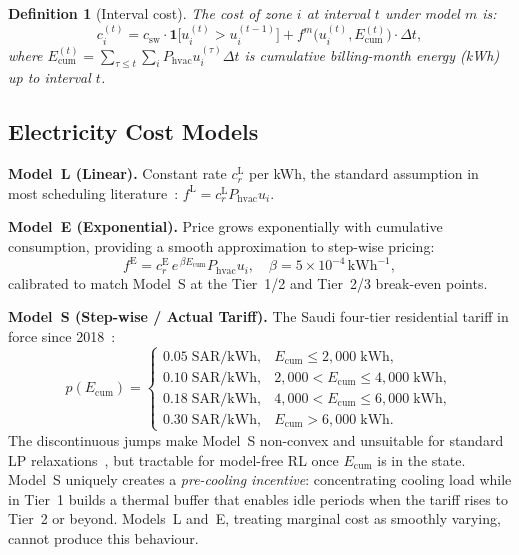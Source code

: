 \documentclass[12pt,a4paper]{article}
\let\oldsubsection\subsection
\renewcommand{\subsection}[1]{\FloatBarrier\oldsubsection{#1}}
\newtheorem{definition}{Definition}
\newcommand{\csw}{c_{\mathrm{sw}}}
\newcommand{\Phvac}{P_{\mathrm{hvac}}}
\newcommand{\SAR}{\text{SAR}}
\newcommand{\kWh}{\text{kWh}}
\begin{document}
\begin{definition}[Interval cost]
\label{def:interval_cost}
The cost of zone $i$ at interval $t$ under model $m$ is:
\begin{equation}
  c_i^{(t)} = \csw\cdot\mathbf{1}\!\bigl[u_i^{(t)}>u_i^{(t-1)}\bigr]
             + f^m\!\bigl(u_i^{(t)},E_{\mathrm{cum}}^{(t)}\bigr)\cdot\Delta t,
  \label{eq:interval_cost}
\end{equation}
where $E_{\mathrm{cum}}^{(t)}=\sum_{\tau\le t}\!\sum_i\Phvac u_i^{(\tau)}\Delta t$
is cumulative billing-month energy (kWh) up to interval $t$.
\end{definition}

\subsection{Electricity Cost Models}
\label{subsec:costmodels}

\textbf{Model~L (Linear).} Constant rate $c_r^{\mathrm{L}}$ per kWh,
the standard assumption in most scheduling
literature~\cite{ElMakroum2023,Gonçalves2022}:
$f^{\mathrm{L}}=c_r^{\mathrm{L}}\Phvac u_i$.

\textbf{Model~E (Exponential).} Price grows exponentially with
cumulative consumption, providing a smooth approximation to step-wise
pricing:
\begin{equation}
  f^{\mathrm{E}}=c_r^{\mathrm{E}}\,e^{\,\beta E_{\mathrm{cum}}}
  \Phvac u_i,\quad \beta=5\times10^{-4}\,\text{kWh}^{-1},
  \label{eq:exp}
\end{equation}
calibrated to match Model~S at the Tier~1/2 and Tier~2/3 break-even
points.

\textbf{Model~S (Step-wise / Actual Tariff).}
The Saudi four-tier residential tariff in force since
2018~\cite{Nahiduzzaman2023}:
\begin{equation}
  p(E_{\mathrm{cum}})=
  \begin{cases}
    0.05\;\SAR/\kWh, & E_{\mathrm{cum}}\le2{,}000\;\kWh,\\
    0.10\;\SAR/\kWh, & 2{,}000<E_{\mathrm{cum}}\le4{,}000\;\kWh,\\
    0.18\;\SAR/\kWh, & 4{,}000<E_{\mathrm{cum}}\le6{,}000\;\kWh,\\
    0.30\;\SAR/\kWh, & E_{\mathrm{cum}}>6{,}000\;\kWh.
  \end{cases}
  \label{eq:stepwise}
\end{equation}
The discontinuous jumps make Model~S non-convex and unsuitable for
standard LP relaxations~\cite{Risbeck2017}, but tractable for
model-free RL once $E_{\mathrm{cum}}$ is in the state.
Model~S uniquely creates a \emph{pre-cooling incentive}: concentrating
cooling load while in Tier~1 builds a thermal buffer that enables idle
periods when the tariff rises to Tier~2 or beyond.
Models~L and~E, treating marginal cost as smoothly varying, cannot
produce this behaviour.
\end{document}
